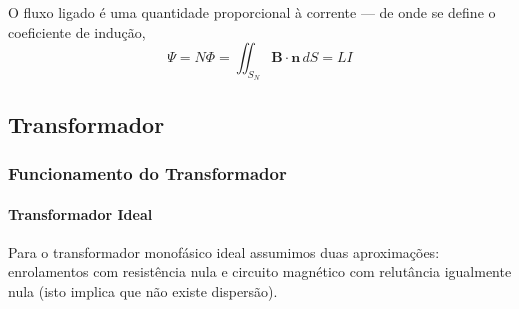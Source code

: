 \noindent O fluxo ligado é uma quantidade proporcional à corrente --- de onde se define o coeficiente de indução,
$$
    \Psi = N \Phi = \iint_{S_N} \mathbf{B} \cdot \mathbf{n}\, dS = L I
$$

\renewcommand{\thefootnote}{\fnsymbol{footnote}}
\renewcommand{\thefootnote}{\arabic{footnote}}

\subsection{Transformador}
\label{subsec:transformador}

\subsubsection{Funcionamento do Transformador}
\label{subsec:transformador-funcionamento}

\paragraph{Transformador Ideal}
\label{subsubsec:transformador-ideal}

Para o transformador monofásico ideal assumimos duas aproximações: enrolamentos com resistência nula e circuito magnético com relutância igualmente nula (isto implica que não existe dispersão).

